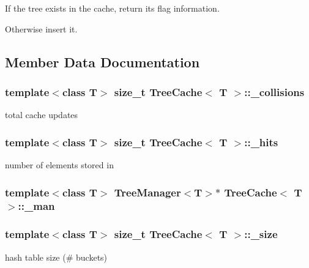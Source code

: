 If the tree exists in the cache, return its flag information. 

Otherwise insert it. 

\subsection{Member Data Documentation}
\subsubsection{\setlength{\rightskip}{0pt plus 5cm}template$<$class T$>$ size\_\-t {\bf Tree\-Cache}$<$ T $>$::{\bf \_\-collisions}}\label{classTreeCache_o2}


total cache updates 

\subsubsection{\setlength{\rightskip}{0pt plus 5cm}template$<$class T$>$ size\_\-t {\bf Tree\-Cache}$<$ T $>$::{\bf \_\-hits}}\label{classTreeCache_o0}


number of elements stored in 

\subsubsection{\setlength{\rightskip}{0pt plus 5cm}template$<$class T$>$ {\bf Tree\-Manager}$<$T$>$$\ast$ {\bf Tree\-Cache}$<$ T $>$::{\bf \_\-man}\hspace{0.3cm}{\tt  [protected]}}\label{classTreeCache_p0}


\subsubsection{\setlength{\rightskip}{0pt plus 5cm}template$<$class T$>$ size\_\-t {\bf Tree\-Cache}$<$ T $>$::{\bf \_\-size}\hspace{0.3cm}{\tt  [protected]}}\label{classTreeCache_p3}


hash table size (\# buckets) 

